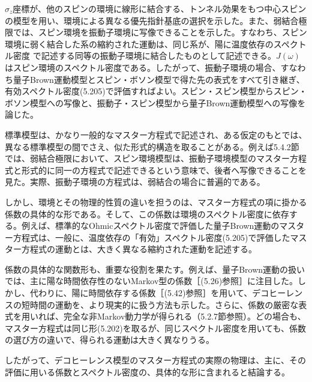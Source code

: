 $\hat\sigma_z$座標が、他のスピンの環境に線形に結合する、トンネル効果をもつ中心スピンの模型を用い、環境による異なる優先指針基底の選択を示した。また、弱結合極限では、スピン環境を振動子環境に写像できることを示した。すなわち、スピン環境に弱く結合した系の縮約された運動は、同じ系が、陽に温度依存のスペクトル密度
で記述する同等の振動子環境に結合したものとして記述できる。$J(\omega)$はスピン環境のスペクトル密度である。したがって、振動子環境の場合、すなわち量子Brown運動模型とスピン・ボソン模型で得た先の表式をすべて引き継ぎ、有効スペクトル密度(5.205)で評価すればよい。スピン・スピン模型からスピン・ボソン模型への写像と、振動子・スピン模型から量子Brown運動模型への写像を論じた。

標準模型は、かなり一般的なマスター方程式で記述され、ある仮定のもとでは、異なる標準模型の間でさえ、似た形式的構造を取ることがある。例えば5.4.2節では、弱結合極限において、スピン環境模型は、振動子環境模型のマスター方程式と形式的に同一の方程式で記述できるという意味で、後者へ写像できることを見た。実際、振動子環境の方程式は、弱結合の場合に普遍的である\cite{ref211}。

しかし、環境とその物理的性質の違いを担うのは、マスター方程式の項に掛かる係数の具体的な形である。そして、この係数は環境のスペクトル密度に依存する。例えば、標準的なOhmicスペクトル密度で評価した量子Brown運動のマスター方程式は、一般に、温度依存の「有効」スペクトル密度(5.205)で評価したマスター方程式の運動とは、大きく異なる縮約された運動を記述する。

\hypertarget{srcpage:241}{}\label{srcpage:241}
係数の具体的な関数形も、重要な役割を果たす。例えば、量子Brown運動の扱いでは、主に陽な時間依存性のないMarkov型の係数［(5.26)参照］に注目した。しかし、代わりに、陽に時間依存する係数［(5.42)参照］を用いて、デコヒーレンスの短時間の運動を、より現実的に扱う方法も示した。さらに、係数の厳密な表式を用いれば、完全な非Markov動力学が得られる（5.2.7節参照）。どの場合も、マスター方程式は同じ形(5.202)を取るが、同じスペクトル密度を用いても、係数の選び方の違いで、得られる運動は大きく異なりうる。

したがって、デコヒーレンス模型のマスター方程式の実際の物理は、主に、その評価に用いる係数とスペクトル密度の、具体的な形に含まれると結論する。

